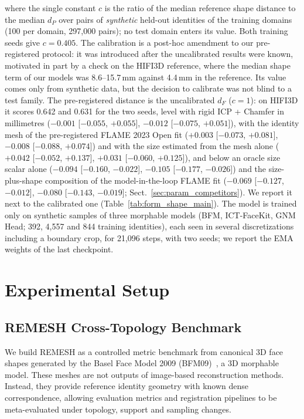 \documentclass[10pt,twocolumn,letterpaper]{article}
\begin{document}
where the single constant $c$ is the ratio of the median reference shape distance to the median $d_P$ over pairs of \emph{synthetic} held-out identities of the training domains (100 per domain, 297{,}000 pairs); no test domain enters its value. Both training seeds give $c=0.405$. The calibration is a post-hoc amendment to our pre-registered protocol: it was introduced after the uncalibrated results were known, motivated in part by a check on the HIFI3D reference, where the median shape term of our models was 8.6--15.7\,mm against 4.4\,mm in the reference. Its value comes only from synthetic data, but the decision to calibrate was not blind to a test family. The pre-registered distance is the uncalibrated $d_F$ ($c=1$): on HIFI3D it scores 0.642 and 0.631 for the two seeds, level with rigid ICP + Chamfer in millimetres ($-0.001$ [$-0.055$, $+0.055$], $-0.012$ [$-0.075$, $+0.051$]), with the identity mesh of the pre-registered FLAME 2023 Open fit ($+0.003$ [$-0.073$, $+0.081$], $-0.008$ [$-0.088$, $+0.074$]) and with the size estimated from the mesh alone ($+0.042$ [$-0.052$, $+0.137$], $+0.031$ [$-0.060$, $+0.125$]), and below an oracle size scalar alone ($-0.094$ [$-0.160$, $-0.022$], $-0.105$ [$-0.177$, $-0.026$]) and the size-plus-shape composition of the model-in-the-loop FLAME fit ($-0.069$ [$-0.127$, $-0.012$], $-0.080$ [$-0.143$, $-0.019$]; Sect.~\ref{sec:param_competitors}). We report it next to the calibrated one (Table~\ref{tab:form_shape_main}). The model is trained only on synthetic samples of three morphable models (BFM, ICT-FaceKit, GNM Head; 392, 4{,}557 and 844 training identities), each seen in several discretizations including a boundary crop, for 21{,}096 steps, with two seeds; we report the EMA weights of the last checkpoint.

\section{Experimental Setup}
\label{sec:experimental_setup}

\subsection{REMESH Cross-Topology Benchmark}
\label{sec:remesh_benchmark}
We build REMESH as a controlled metric benchmark from canonical 3D face shapes generated by the Basel Face Model 2009 (BFM09)~\cite{paysan2009bfm}, a 3D morphable model. These meshes are not outputs of image-based reconstruction methods. Instead, they provide reference identity geometry with known dense correspondence, allowing evaluation metrics and registration pipelines to be meta-evaluated under topology, support and sampling changes.
\end{document}
